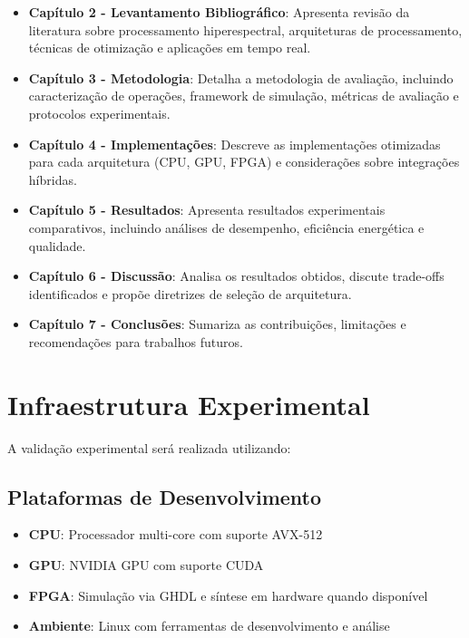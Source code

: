 \begin{itemize}
    \item \textbf{Capítulo 2 - Levantamento Bibliográfico}: Apresenta revisão da literatura sobre processamento hiperespectral, arquiteturas de processamento, técnicas de otimização e aplicações em tempo real.
    
    \item \textbf{Capítulo 3 - Metodologia}: Detalha a metodologia de avaliação, incluindo caracterização de operações, framework de simulação, métricas de avaliação e protocolos experimentais.
    
    \item \textbf{Capítulo 4 - Implementações}: Descreve as implementações otimizadas para cada arquitetura (CPU, GPU, FPGA) e considerações sobre integrações híbridas.
    
    \item \textbf{Capítulo 5 - Resultados}: Apresenta resultados experimentais comparativos, incluindo análises de desempenho, eficiência energética e qualidade.
    
    \item \textbf{Capítulo 6 - Discussão}: Analisa os resultados obtidos, discute trade-offs identificados e propõe diretrizes de seleção de arquitetura.
    
    \item \textbf{Capítulo 7 - Conclusões}: Sumariza as contribuições, limitações e recomendações para trabalhos futuros.
\end{itemize}

\section{Infraestrutura Experimental}\label{sec:infraestrutura}

A validação experimental será realizada utilizando:

\subsection{Plataformas de Desenvolvimento}
\begin{itemize}
    \item \textbf{CPU}: Processador multi-core com suporte AVX-512
    \item \textbf{GPU}: NVIDIA GPU com suporte CUDA
    \item \textbf{FPGA}: Simulação via GHDL e síntese em hardware quando disponível
    \item \textbf{Ambiente}: Linux com ferramentas de desenvolvimento e análise
\end{itemize}

